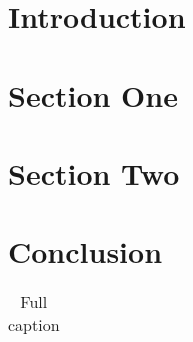 \documentclass[12pt, titlepage]{MARSarticle}
\begin{document}


\section{Introduction}
\section{Section One}
\section{Section Two}
\section{Conclusion}

	\begin{table}[ht]
	    \centering
	    \caption[Short Title]{Full caption}
	    \bigskip

	    \begin{tabular}{|l|c|l|c|}
	    \end{tabular}
	    \label{tab:1}
	\end{table}
	



    \clearpage
    \providecommand*{\phantomsection}{}
    \phantomsection
    


    \appendix

\end{document}
